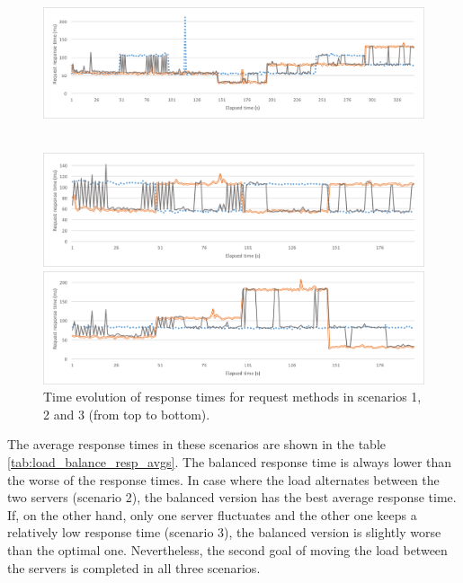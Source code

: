 \begin{figure}[h!]
	\captionsetup{justification=centering,margin=0.5cm}
	\centerline{
		\mbox{
			\includegraphics[width=130mm]{./img/load_balance_scen1.png}
		}
	}
	\centerline{
		\mbox{\includegraphics[width=130mm]{./img/load_balance_scen2.png}}
	}
	\centerline{
		\mbox{\includegraphics[width=130mm]{./img/load_balance_scen3.png}}
	}
	\caption{Time evolution of response times for request methods in scenarios 1, 2 and 3 (from top to bottom).}
	\label{fig:load_balance_scen}
\end{figure}

The average response times in these scenarios are shown in the table \ref{tab:load_balance_resp_avgs}. The balanced response time is always lower than the worse of the response times. In case where the load alternates between the two servers (scenario 2), the balanced version has the best average response time. If, on the other hand, only one server fluctuates and the other one keeps a relatively low response time (scenario 3), the balanced version is slightly worse than the optimal one. Nevertheless, the second goal of moving the load between the servers is completed in all three scenarios.

